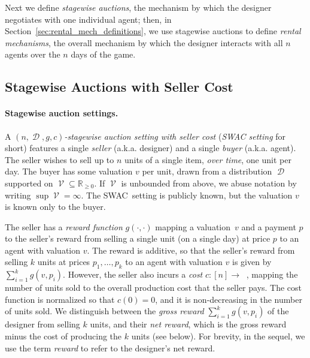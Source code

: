 \documentclass[11pt,letterpaper]{article}
\newcommand{\sqbr}[1]{\left[ #1 \right]}
\newcommand{\swac}{SWAC\xspace}
\newcommand{\reals}{\mathbb{R}}
\DeclareMathOperator{\preals}{\reals_{\geq0}}
\DeclareMathOperator{\D}{\mathcal{D}}
\DeclareMathOperator{\V}{\mathcal{V}}
\newcommand{\g}{g}
\theoremstyle{plain}
\begin{document}
Next we define \emph{stagewise auctions},
the mechanism by which the designer negotiates with one individual agent;
then, in 
Section~\ref{sec:rental_mech_definitions}, we 
use stagewise auctions to define \emph{rental mechanisms},
the overall mechanism by which the designer interacts with all $n$ agents over the $n$ days of the game.




\subsection{Stagewise Auctions with Seller Cost}
\label{subsection:auction}

\paragraph{Stagewise auction settings.}
A \emph{$(n,\D,\g,c)$-stagewise auction setting with seller cost} (\emph{\swac setting} for short)
features a single \emph{seller} (a.k.a. designer) and a single \emph{buyer} (a.k.a. agent).
The seller wishes to sell up to $n$ units of a single item,
\emph{over time},
one unit per day.
The buyer has some valuation $v$ per unit, drawn from a distribution $\D$
supported on $\V\subseteq \mathbb{R}_{\ge 0}$.
If $\V$ is unbounded from above, we abuse notation by writing $\sup\V=\infty$.
The \swac\ setting is publicly known, but the valuation $v$ is known only to the buyer.

The seller has a \emph{reward function} $g(\cdot,\cdot)$
mapping a valuation~$v$ and a payment $p$ to the seller's reward from selling
a single unit (on a single day) at price $p$ to an agent with valuation $v$. The reward is additive,
so that the seller's reward from selling $k$ units at prices $p_1,\ldots,p_k$ to an agent with valuation $v$ is given by $\sum_{i = 1}^k g(v, p_i)$.
However, 
the seller also
incurs a \emph{cost} $c:\sqbr{n}\rightarrow\preals$,
mapping the number of units sold to the overall production cost that the seller pays. 
The cost function is normalized so that $c(0)=0$, and it is non-decreasing in the number of units sold.
We distinguish between the \emph{gross reward} $\sum_{i = 1}^k g(v,p_i)$ of the designer from selling $k$ units, and their \emph{net reward}, which is the gross reward minus the cost of producing the $k$ units (see below).
For brevity, in the sequel,
we use the term \emph{reward} to refer to the designer's net reward.
\end{document}
